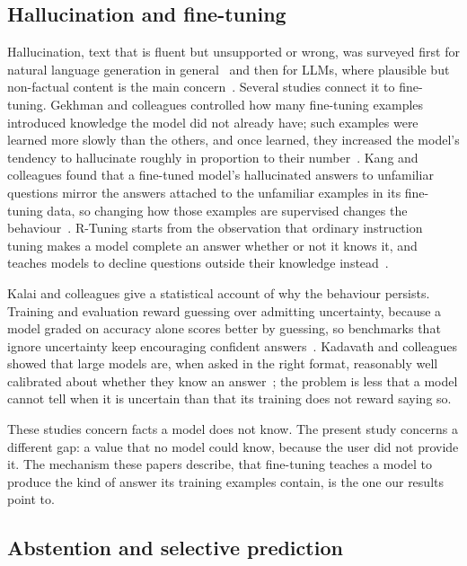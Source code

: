 \subsection{Hallucination and fine-tuning}
\label{sec:rev-hallucination}

Hallucination, text that is fluent but unsupported or wrong, was surveyed first for natural language generation in general~\cite{ji2023survey} and then for LLMs, where plausible but non-factual content is the main concern~\cite{huang2025survey}. Several studies connect it to fine-tuning. Gekhman and colleagues controlled how many fine-tuning examples introduced knowledge the model did not already have; such examples were learned more slowly than the others, and once learned, they increased the model's tendency to hallucinate roughly in proportion to their number~\cite{gekhman2024finetuning}. Kang and colleagues found that a fine-tuned model's hallucinated answers to unfamiliar questions mirror the answers attached to the unfamiliar examples in its fine-tuning data, so changing how those examples are supervised changes the behaviour~\cite{kang2025unfamiliar}. R-Tuning starts from the observation that ordinary instruction tuning makes a model complete an answer whether or not it knows it, and teaches models to decline questions outside their knowledge instead~\cite{zhang2024rtuning}.

Kalai and colleagues give a statistical account of why the behaviour persists. Training and evaluation reward guessing over admitting uncertainty, because a model graded on accuracy alone scores better by guessing, so benchmarks that ignore uncertainty keep encouraging confident answers~\cite{kalai2025why}. Kadavath and colleagues showed that large models are, when asked in the right format, reasonably well calibrated about whether they know an answer~\cite{kadavath2022language}; the problem is less that a model cannot tell when it is uncertain than that its training does not reward saying so.

These studies concern facts a model does not know. The present study concerns a different gap: a value that no model could know, because the user did not provide it. The mechanism these papers describe, that fine-tuning teaches a model to produce the kind of answer its training examples contain, is the one our results point to.

\subsection{Abstention and selective prediction}
\label{sec:rev-abstention}

